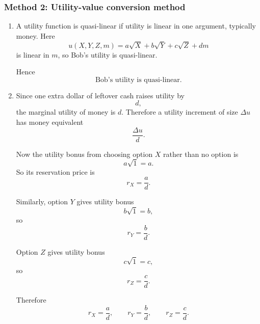 \documentclass[12pt]{article}
\begin{document}
\newpage
\subsubsection{Method 2: Utility-value conversion method}
\begin{enumerate}[label=(\alph*)]
    \item
    A utility function is quasi-linear if utility is linear in one argument, typically money. Here
    \[
    u(X,Y,Z,m)=a\sqrt{X}+b\sqrt{Y}+c\sqrt{Z}+dm
    \]
    is linear in \(m\), so Bob’s utility is quasi-linear.

    Hence
    \[
    \boxed{\text{Bob’s utility is quasi-linear.}}
    \]

    \item
    Since one extra dollar of leftover cash raises utility by
    \[
    d,
    \]
    the marginal utility of money is \(d\). Therefore a utility increment of size \(\Delta u\) has money equivalent
    \[
    \frac{\Delta u}{d}.
    \]

    Now the utility bonus from choosing option \(X\) rather than no option is
    \[
    a\sqrt{1}=a.
    \]
    So its reservation price is
    \[
    \boxed{r_X=\frac{a}{d}.}
    \]

    Similarly, option \(Y\) gives utility bonus
    \[
    b\sqrt{1}=b,
    \]
    so
    \[
    \boxed{r_Y=\frac{b}{d}.}
    \]

    Option \(Z\) gives utility bonus
    \[
    c\sqrt{1}=c,
    \]
    so
    \[
    \boxed{r_Z=\frac{c}{d}.}
    \]

    Therefore
    \[
    \boxed{
    r_X=\frac{a}{d},\qquad
    r_Y=\frac{b}{d},\qquad
    r_Z=\frac{c}{d}.
    }
    \]
\end{enumerate}

\newpage
\end{document}

